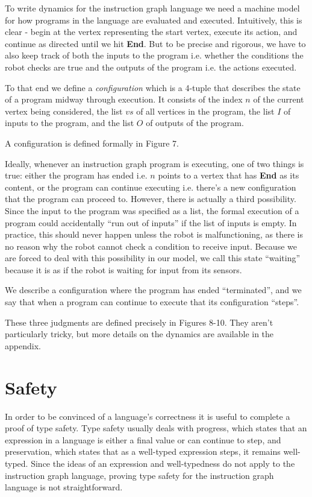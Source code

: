 \documentclass{sig-alternate-05-2015}
\begin{document}
To write dynamics for the instruction graph language we need a machine model for
how programs in the language are evaluated and executed. Intuitively, this is
clear - begin at the vertex representing the start vertex, execute its action,
and continue as directed until we hit \textbf{End}. But to be precise and
rigorous, we have to also keep track of both the inputs to the program i.e.
whether the conditions the robot checks are true and the outputs of the program
i.e. the actions executed.

To that end we define a \textit{configuration} which is a 4-tuple that describes
the state of a program midway through execution. It consists of the index $n$ of
the current vertex being considered, the list $vs$ of all vertices in the
program, the list $I$ of inputs to the program, and the list $O$ of outputs of
the program.

A configuration is defined formally in Figure 7.

\clearpage

Ideally, whenever an instruction graph program is executing, one of two things
is true: either the program has ended i.e. $n$ points to a vertex that has
\textbf{End} as its content, or the program can continue executing i.e. there's
a new configuration that the program can proceed to. However, there is actually
a third possibility. Since the input to the program was specified as a list, the
formal execution of a program could accidentally ``run out of inputs'' if the
list of inputs is empty. In practice, this should never happen unless the robot
is malfunctioning, as there is no reason why the robot cannot check a condition
to receive input. Because we are forced to deal with this possibility in our
model, we call this state ``waiting'' because it is as if the robot is waiting
for input from its sensors.

We describe a configuration where the program has ended ``terminated'', and we
say that when a program can continue to execute that its configuration
``steps''.

These three judgments are defined precisely in Figures 8-10. They aren't
particularly tricky, but more details on the dynamics are available in the
appendix.

\section{Safety}

In order to be convinced of a language's correctness it is useful to complete a
proof of type safety. Type safety usually deals with progress, which states that
an expression in a language is either a final value or can continue to step,
and preservation, which states that as a well-typed expression steps, it remains
well-typed. Since the ideas of an expression and well-typedness do not apply to
the instruction graph language, proving type safety for the instruction graph
language is not straightforward.
\end{document}
